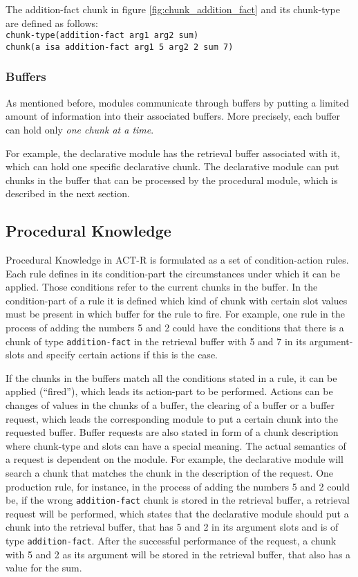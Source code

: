 \begin{example}
 The addition-fact chunk in figure \ref{fig:chunk_addition_fact} and its chunk-type are defined as follows:\\
 \verb|chunk-type(addition-fact arg1 arg2 sum)|\\
 \verb|chunk(a isa addition-fact arg1 5 arg2 2 sum 7)|
\end{example}

\subsubsection{Buffers}

As mentioned before, modules communicate through buffers by putting a limited amount of information into their associated buffers. More precisely, each buffer can hold only \emph{one chunk at a time}.

For example, the declarative module has the retrieval buffer associated with it, which can hold one specific declarative chunk. The declarative module can put chunks in the buffer that can be processed by the procedural module, which is described in the next section.

\subsection{Procedural Knowledge}

Procedural Knowledge in ACT-R is formulated as a set of condition-action rules. Each rule defines in its condition-part the circumstances under which it can be applied. Those conditions refer to the current chunks in the buffer. In the condition-part of a rule it is defined which kind of chunk with certain slot values must be present in which buffer for the rule to fire. For example, one rule in the process of adding the numbers 5 and 2 could have the conditions that there is a chunk of type \verb|addition-fact| in the retrieval buffer with 5 and 7 in its argument-slots and specify certain actions if this is the case.

If the chunks in the buffers match all the conditions stated in a rule, it can be applied (``fired''), which leads its action-part to be performed. Actions can be changes of values in the chunks of a buffer, the clearing of a buffer or a buffer request, which leads the corresponding module to put a certain chunk into the requested buffer. Buffer requests are also stated in form of a chunk description where chunk-type and slots can have a special meaning. The actual semantics of a request is dependent on the module. For example, the declarative module will search a chunk that matches the chunk in the description of the request. One production rule, for instance, in the process of adding the numbers 5 and 2 could be, if the wrong \verb|addition-fact| chunk is stored in the retrieval buffer, a retrieval request will be performed, which states that the declarative module should put a chunk into the retrieval buffer, that has 5 and 2 in its argument slots and is of type \verb|addition-fact|. After the successful performance of the request, a chunk with 5 and 2 as its argument will be stored in the retrieval buffer, that also has a value for the sum.

